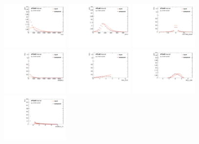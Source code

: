 \begin{figure}[htbp]
  \centering
 \includegraphics[width=0.3\textwidth]{figures/VBF/BDT_mJJ_4cen.pdf}
 \includegraphics[width=0.3\textwidth]{figures/VBF/BDT_pTJJ_4cen.pdf}
 \includegraphics[width=0.3\textwidth]{figures/VBF/BDT_cosTheta_4cen.pdf}\\
 \includegraphics[width=0.3\textwidth]{figures/VBF/BDT_deltaMJJ_4cen.pdf}
 \includegraphics[width=0.3\textwidth]{figures/VBF/BDT_maxJ1J2_4cen.pdf}
 \includegraphics[width=0.3\textwidth]{figures/VBF/BDT_etaJstar_4cen.pdf}\\
 \includegraphics[width=0.3\textwidth]{figures/VBF/BDT_mindRJ1_4cen.pdf}

\end{figure}
